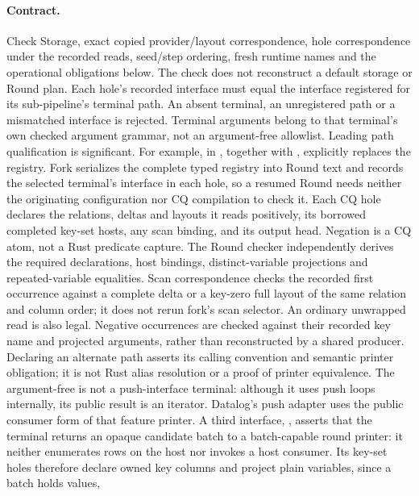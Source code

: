 \paragraph{Contract.} Check Storage, exact copied provider/layout correspondence,
hole correspondence under the recorded reads, seed/step ordering, fresh runtime
names and the operational obligations below. The check does not reconstruct a
default storage or Round plan. Each hole's recorded interface must equal the
interface registered for its sub-pipeline's terminal path. An absent terminal,
an unregistered path or a mismatched interface is rejected. Terminal arguments
belong to that terminal's own checked argument grammar, not an argument-free
allowlist. Leading path qualification is significant.
For example,  in
, together with
, explicitly replaces
the registry. Fork serializes the complete typed registry into Round text and
records the selected terminal's interface in each hole, so a resumed Round
needs neither the originating configuration nor CQ compilation to check it.
Each CQ hole declares the relations, deltas and layouts it reads positively,
its borrowed completed key-set hosts, any scan binding, and its output head.
Negation is a CQ  atom, not a Rust predicate capture.
The Round checker independently derives the required declarations, host
bindings, distinct-variable projections and repeated-variable equalities.
Scan correspondence checks the recorded first occurrence against a complete
delta or a key-zero full layout of the same relation and column order; it does
not rerun fork's scan selector. An ordinary unwrapped read is also legal.
Negative occurrences are checked against their recorded key name and projected
arguments, rather than reconstructed by a shared producer.
Declaring an alternate path asserts its calling convention and semantic printer
obligation; it is not Rust alias resolution or a proof of printer equivalence.
The argument-free  is not a push-interface terminal:
although it uses push loops internally, its public result is an iterator.
Datalog's push adapter uses the public consumer form of that feature printer.
A third interface, , asserts that the terminal returns an opaque
candidate batch to a batch-capable round printer: it neither enumerates rows on
the host nor invokes a host consumer. Its key-set holes therefore declare
owned key columns and project plain variables, since a batch holds values,
